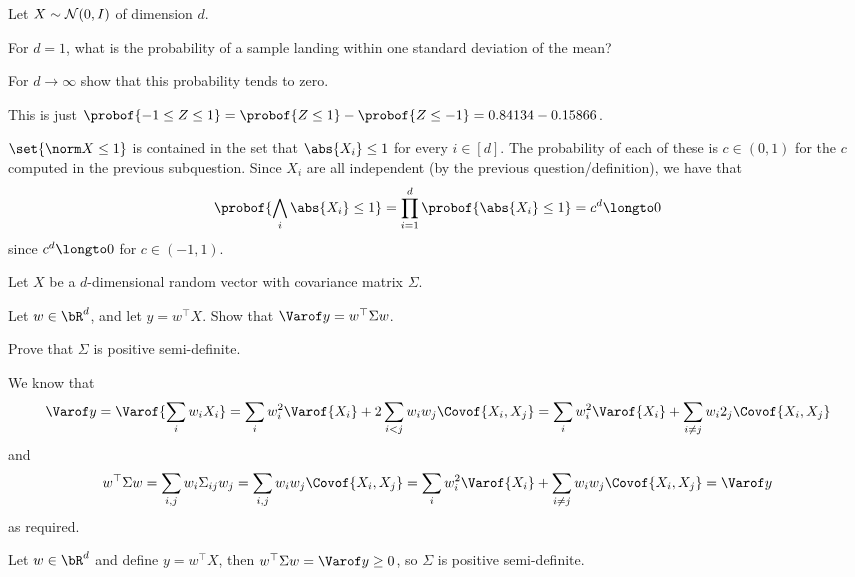     Let $X\sim{\cal N}(0,I)$ of dimension $d$.
    \benum
        \item For $d=1$, what is the probability of a sample landing within one standard deviation of the mean?
        \item For $d\to\infty$ show that this probability tends to zero.
    \eenum

\eexerc

\benum
    \item This is just $\probof{-1\leq Z\leq 1}=\probof{Z\leq 1}-\probof{Z\leq-1}=0.84134-0.15866$.
    \item $\set{\norm X\leq1}$ is contained in the set that $\abs{X_i}\leq1$ for every $i\in[d]$.
    The probability of each of these is $c\in(0,1)$ for the $c$ computed in the previous subquestion.
    Since $X_i$ are all independent (by the previous question/definition), we have that
    $$ \probof{\bigwedge_i\abs{X_i}\leq1} = \prod_{i=1}^d\probof{\abs{X_i}\leq1} = c^d \longto 0 $$
    since $c^d\longto0$ for $c\in(-1,1)$.
\eenum

\bexerc

    Let $X$ be a $d$-dimensional random vector with covariance matrix $\Sigma$.
    \benum
        \item Let $w\in\bR^d$, and let $y=w^\top X$.
        Show that $\Varof y=w^\top\Sigma w$.
        \item Prove that $\Sigma$ is positive semi-definite.
    \eenum

\eexerc

\benum
    \item We know that
    $$ \Varof y = \Varof{\sum_i w_iX_i} = \sum_iw_i^2\Varof{X_i} + 2\sum_{i<j}w_iw_j\Covof{X_i,X_j} = \sum_iw_i^2\Varof{X_i} + \sum_{i\neq j}w_i2_j\Covof{X_i,X_j} $$
    and
    $$ w^\top\Sigma w = \sum_{i,j}w_i\Sigma_{ij}w_j = \sum_{i,j} w_iw_j\Covof{X_i,X_j} = \sum_i w_i^2\Varof{X_i} + \sum_{i\neq j}w_iw_j\Covof{X_i,X_j} = \Varof y $$
    as required.
    \item Let $w\in\bR^d$ and define $y=w^\top X$, then $w^\top\Sigma w=\Varof y\geq0$, so $\Sigma$ is positive semi-definite.
\eenum

\bye

